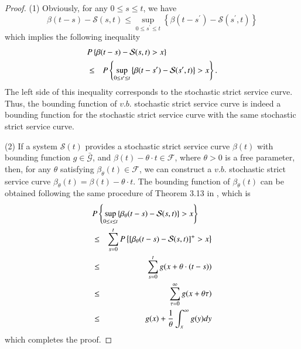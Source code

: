 \documentclass[paper]{ieice}
\newtheorem{proof}{Proof}
\begin{document}
\begin{proof}
(1) Obviously, for any $0\leq s\leq t$, we have
$$\beta(t-s)-\mathcal{S}(s,t)\leq \sup_{0\leq s^\prime\leq t}\left\{\beta(t-s^\prime)-\mathcal{S}(s^\prime,t)\right\}$$
which implies the following inequality
\begin{eqnarray*}
\lefteqn{P\left\{\beta(t-s)-\mathcal{S}(s,t)>x\right\}}\\
&\leq& P\left\{\sup_{0\leq s^\prime\leq t}\left\{\beta(t-s^\prime)-\mathcal{S}(s^\prime,t)\right\}>x\right\}.
\end{eqnarray*}
The left side of this inequality corresponds to the stochastic strict service curve. Thus, the bounding function of $v.b.$ stochastic strict service curve is indeed a bounding function for the stochastic strict service curve with the same stochastic strict service curve.

(2) If a system $\mathcal{S}(t)$ provides a stochastic strict service curve $\beta(t)$ with bounding function $g\in\bar{\mathcal{G}}$, and $\beta(t)-\theta \cdot t\in\mathcal{F}$, where $\theta>0$ is a free parameter, then, for any $\theta$ satisfying $\beta_{\theta}(t)\in\mathcal{F}$, we can construct a $v.b.$ stochastic strict service curve $\beta_{\theta}(t)=\beta(t)-\theta \cdot t$. The bounding function of $\beta_\theta(t)$ can be obtained following the same procedure of Theorem 3.13 in \cite{JiangLiu-15877}, which is
\begin{eqnarray*}
\lefteqn{P\left\{\sup_{0\leq s\leq t}\{\beta_{\theta}(t-s)-\mathcal{S}(s,t)\}>x\right\}}\\
&\leq &\sum_{s=0}^t P\left\{[\beta_{\theta}(t-s)-\mathcal{S}(s,t)]^+>x\right\}\\
&\leq &\sum_{s=0}^t g(x+\theta\cdot(t-s))\\
&\leq & \sum_{\tau=0}^\infty g(x+\theta\tau)\\
&\leq & g(x)+\frac{1}{\theta}\int_{x}^\infty g(y)dy
\end{eqnarray*}
which completes the proof.\QED
\end{proof}
\end{document}
